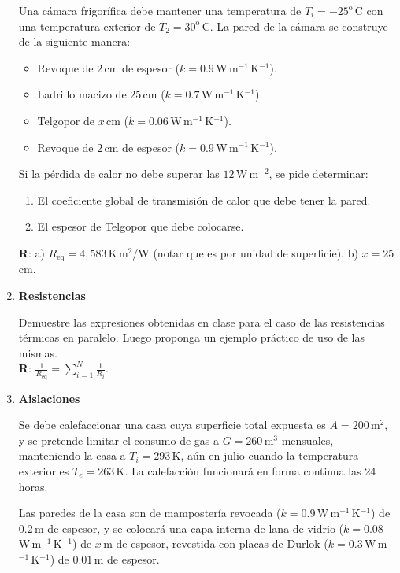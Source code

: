 \documentclass[a4paper,12pt]{article}
\begin{document}
\begin{enumerate}
		Una cámara frigorífica debe mantener una temperatura de
		$T_i=-25^\mathrm{o}$\,C con una temperatura exterior de
		$T_2=30^\mathrm{o}$\,C. La pared de la cámara se construye de la
		siguiente manera:
		\begin{itemize}
			\item Revoque de $2$\,cm de espesor
				($k=0.9$\,W\,m$^{-1}$\,K$^{-1}$).
			\item Ladrillo macizo de $25$\,cm ($k=0.7$\,W\,m$^{-1}$\,K$^{-1}$).
			\item Telgopor de $x$\,cm ($k=0.06$\,W\,m$^{-1}$\,K$^{-1}$).
			\item Revoque de $2$\,cm de espesor
				($k=0.9$\,W\,m$^{-1}$\,K$^{-1}$).
		\end{itemize}
		Si la pérdida de calor no debe superar las $12$\,W\,m$^{-2}$, se pide
		determinar:
		\begin{enumerate}
			\item El coeficiente global de transmisión de calor que debe tener
				la pared.
			\item El espesor de Telgopor que debe colocarse.
		\end{enumerate}
		{\bf{R}}: a) $R_{\mathrm{eq}}=4,583$\,K\,m$^2$/W (notar que es por
		unidad de superficie). b) $x=25$\,cm. 

	\item {\bf{Resistencias}}

		Demuestre las expresiones obtenidas en clase para el caso de las
		resistencias térmicas en paralelo. Luego proponga un ejemplo práctico
		de uso de las mismas. 
		\\{\bf{R}}: $\frac{1}{R_{\mathrm{eq}}}=\sum\limits_{i=1}^N \frac{1}{R_i}$. 
	
	\item {\bf{Aislaciones}}
		
		Se debe calefaccionar una casa cuya superficie total expuesta es
		$A=200$\,m$^2$, y se pretende limitar el consumo de gas a
		$G=260$\,m$^3$ mensuales, manteniendo la casa a $T_i=293$\,K, aún en
		julio cuando la temperatura exterior es $T_e=263$\,K. La calefacción
		funcionará en forma continua las 24 horas.
		
		Las paredes de la casa son de mampostería revocada
		($k=0.9$\,W\,m$^{-1}$\,K$^{-1}$) de $0.2$\,m de espesor, y se colocará
		una capa interna de lana de vidrio ($k=0.08$\,W\,m$^{-1}$\,K$^{-1}$) de
		$x$\,m de espesor, revestida con placas de Durlok
		($k=0.3$\,W\,m$^{-1}$\,K$^{-1}$) de $0.01$\,m de espesor.
		

\end{enumerate}
\end{document}
